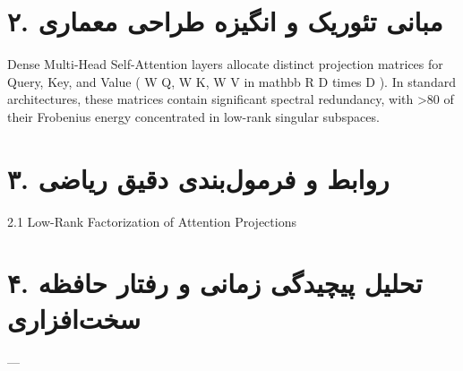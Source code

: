 \documentclass[12pt,a4paper]{article}
\begin{document}
\section*{۲. مبانی تئوریک و انگیزه طراحی معماری}
Dense Multi-Head Self-Attention layers allocate distinct projection matrices for Query, Key, and Value ( W Q, W K, W V in mathbb R D times D ). In standard architectures, these matrices contain significant spectral redundancy, with >80 of their Frobenius energy concentrated in low-rank singular subspaces.

\section*{۳. روابط و فرمول‌بندی دقیق ریاضی}
2.1 Low-Rank Factorization of Attention Projections

\section*{۴. تحلیل پیچیدگی زمانی و رفتار حافظه سخت‌افزاری}
---
\end{document}
